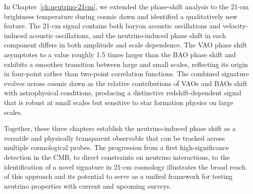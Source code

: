 In Chapter~\ref{ch:neutrino-21cm}, we extended the phase-shift analysis to the 21-cm brightness temperature during cosmic dawn and identified a qualitatively new feature. The 21-cm signal contains both baryon acoustic oscillations and velocity-induced acoustic oscillations, and the neutrino-induced phase shift in each component differs in both amplitude and scale dependence. The VAO phase shift asymptotes to a value roughly 1.5 times larger than the BAO phase shift and exhibits a smoother transition between large and small scales, reflecting its origin in four-point rather than two-point correlation functions. The combined signature evolves across cosmic dawn as the relative contributions of VAOs and BAOs shift with astrophysical conditions, producing a distinctive redshift-dependent signal that is robust at small scales but sensitive to star formation physics on large scales.

Together, these three chapters establish the neutrino-induced phase shift as a versatile and physically transparent observable that can be tracked across multiple cosmological probes. The progression from a first high-significance detection in the CMB, to direct constraints on neutrino interactions, to the identification of a novel signature in 21-cm cosmology illustrates the broad reach of this approach and its potential to serve as a unified framework for testing neutrino properties with current and upcoming surveys.
